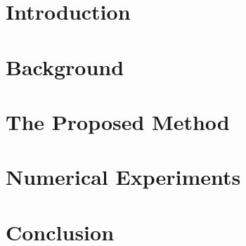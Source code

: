 \documentclass[reqno,12pt]{amsart}
\renewcommand{\algorithmcfname}{ALGORITHM}
\begin{document}
\maketitle


\newcommand{\mgap}{\;\;}
\newcommand{\bgap}{\;\;\;}
\newcommand{\qDef}{{\mathcal Q}}
\newcommand{\defined}{\mathop{\,{\scriptstyle\stackrel{\triangle}{=}}}\,}
\newcommand{\diag}{\text{diag}}
\renewcommand{\algorithmcfname}{ALGORITHM}

\makeatletter
\newcommand{\minimize}[1]{{\displaystyle\minim_{#1}}}
\newcommand{\minim}{\mathop{\operator@font{minimize}}}
\newcommand{\subject}{\mathop{\operator@font{subject\ to}}}  
\newcommand{\words}[1]{\mgap\text{#1}\mgap}
\def\BFGS{{\small BFGS}}
\def\LBFGS{{\small L-BFGS}}
\def\LSR{{\small L-SR1}}
\def\SR{{\small SR1}}
\def\CG{{\small CG}}
\def\DFP{{\small DFP}}
\def\OBS{{\small OBS}}
\def\OBSSC{{\small OBS-SC}}
\def\SCSR1{{\small SC-SR1}}
\def\PSB{{\small PSB}}
\def\QR{{\small QR}}
\def\MATLAB{{\small MATLAB}}
\renewcommand{\algorithmcfname}{ALGORITHM}
\renewcommand{\vec}[1]{#1}

\makeatother

\pagestyle{myheadings}
\thispagestyle{plain}

\section{Introduction}
\label{sec:intro}


\section{Background}
\label{sec:background}


\section{The Proposed Method}
\label{sec:method}


\section{Numerical Experiments}
\label{sec:numexp}


\section{Conclusion}






\end{document}
